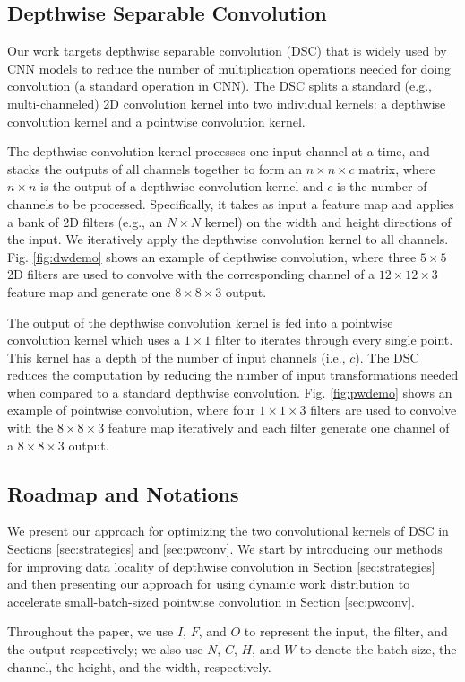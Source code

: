 \subsection{Depthwise Separable Convolution}
Our work targets depthwise separable convolution (DSC) that is widely used by  CNN  models to reduce the number of multiplication
operations needed for doing convolution (a standard operation in CNN). The DSC splits a standard (e.g., multi-channeled) 2D
convolution kernel into two individual kernels: a depthwise convolution kernel and a pointwise convolution kernel. 

The depthwise
convolution kernel processes one input channel at a time, and stacks the outputs of all channels together to form an $n \times n \times c$
matrix, where $n \times n$ is the output of a depthwise convolution kernel and $c$ is the number of channels to be processed. Specifically,
it takes as input a feature map and applies a bank of 2D filters (e.g., an $N \times N$ kernel) on the width and height directions of
the input. We iteratively apply the depthwise convolution kernel to all channels. Fig. \ref{fig:dwdemo} shows an example of depthwise convolution, where three $5 \times 5$ 2D filters are used to convolve with the corresponding channel of a $12 \times 12 \times 3$ feature map and generate one $8 \times 8 \times 3$ output. 

The output of the depthwise convolution kernel is fed
into a pointwise convolution kernel which uses a $1 \times 1$ filter to iterates through every single point. This kernel has a depth of the
number of input channels (i.e., $c$). The DSC reduces the computation by reducing the number of input transformations needed when compared
to a standard depthwise convolution. Fig. \ref{fig:pwdemo} shows an example of pointwise convolution, where four $1 \times 1 \times 3$ filters are used to convolve with the $8 \times 8 \times 3$ feature map iteratively and each filter generate one channel of a $8 \times 8 \times 3$ output.


\subsection{Roadmap and Notations\label{sec:roadmap}} We present our approach for optimizing the two convolutional kernels of DSC in
Sections \ref {sec:strategies} and \ref {sec:pwconv}. We start by introducing our methods for improving data locality of depthwise
convolution in Section \ref{sec:strategies} and then presenting our approach for using dynamic work distribution to accelerate
small-batch-sized pointwise convolution in Section \ref {sec:pwconv}.

 Throughout the paper, we use $I$, $F$, and $O$ to represent the input, the filter, and the output respectively; we also
use $N$, $C$, $H$, and $W$ to denote the batch size, the channel, the height, and the width, respectively.
